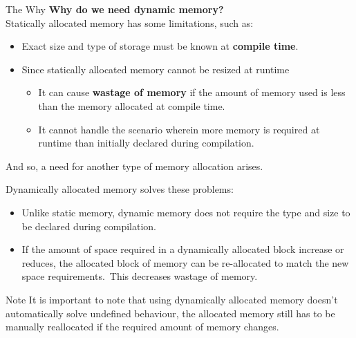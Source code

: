 \documentclass[11pt]{beamer}
\begin{document}
    \begin{frame}[allowframebreaks]{The Why}
        \textbf{Why do we need dynamic memory?}\\[10pt]
        Statically allocated memory has some limitations, such as:\\[5pt]
        \begin{itemize}
            \item Exact size and type of storage must be known at \textbf{compile time}.
            \item Since statically allocated memory cannot be resized at runtime
            \begin{itemize}
                \item It can cause \textbf{wastage of memory} if the amount of memory used is less than the memory
                allocated at compile time.
                \item It cannot handle the scenario wherein more memory is required at runtime than initially declared
                during compilation.
            \end{itemize}
        \end{itemize}
        And so, a need for another type of memory allocation arises.

        \framebreak

        Dynamically allocated memory solves these problems:\\[5pt]

        \begin{itemize}
            \item Unlike static memory, dynamic memory does not require the type and size to be declared during
            compilation.
            \item If the amount of space required in a dynamically allocated block increase or reduces, the allocated
            block of memory can be re-allocated to match the new space requirements.\ This decreases wastage of memory.
        \end{itemize}

        \begin{block}{Note}
            It is important to note that using dynamically allocated memory doesn't automatically solve undefined
            behaviour, the allocated memory still has to be manually reallocated if the required amount of memory
            changes.
        \end{block}
    \end{frame}
\end{document}
